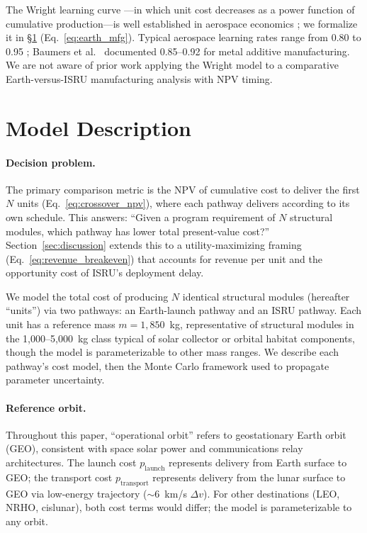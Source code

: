 \documentclass[preprint,12pt]{elsarticle}
\begin{document}
The Wright learning curve \cite{wright1936}---in which unit cost decreases as a power function of cumulative production---is well established in aerospace economics \cite{dutton1984,argote1990,nagy2013}; we formalize it in \S\ref{sec:model} (Eq.~\ref{eq:earth_mfg}). Typical aerospace learning rates range from 0.80 to 0.95 \cite{wertz2011}; Baumers et al.\ \cite{baumers2016} documented 0.85--0.92 for metal additive manufacturing. We are not aware of prior work applying the Wright model to a comparative Earth-versus-ISRU manufacturing analysis with NPV timing.

\section{Model Description}
\label{sec:model}

\paragraph{Decision problem.} The primary comparison metric is the NPV of cumulative cost to deliver the first $N$ units (Eq.~\ref{eq:crossover_npv}), where each pathway delivers according to its own schedule. This answers: ``Given a program requirement of $N$ structural modules, which pathway has lower total present-value cost?'' Section~\ref{sec:discussion} extends this to a utility-maximizing framing (Eq.~\ref{eq:revenue_breakeven}) that accounts for revenue per unit and the opportunity cost of ISRU's deployment delay.

We model the total cost of producing $N$ identical structural modules (hereafter ``units'') via two pathways: an Earth-launch pathway and an ISRU pathway. Each unit has a reference mass $m = 1{,}850$~kg, representative of structural modules in the 1{,}000--5{,}000~kg class typical of solar collector or orbital habitat components, though the model is parameterizable to other mass ranges. We describe each pathway's cost model, then the Monte Carlo framework used to propagate parameter uncertainty.

\paragraph{Reference orbit.} Throughout this paper, ``operational orbit'' refers to geostationary Earth orbit (GEO), consistent with space solar power and communications relay architectures. The launch cost $p_{\mathrm{launch}}$ represents delivery from Earth surface to GEO; the transport cost $p_{\mathrm{transport}}$ represents delivery from the lunar surface to GEO via low-energy trajectory ($\sim$6~km/s $\Delta v$). For other destinations (LEO, NRHO, cislunar), both cost terms would differ; the model is parameterizable to any orbit.
\end{document}
